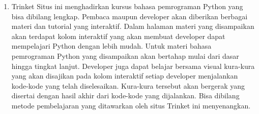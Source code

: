 \begin{enumerate}
\item Trinket 
Situs ini menghadirkan kursus bahasa pemrograman Python 
yang bisa dibilang lengkap. Pembaca maupun developer 
akan diberikan berbagai materi dan tutorial yang interaktif. 
Dalam halaman materi yang disampaikan akan terdapat 
kolom interaktif yang akan membuat developer dapat mempelajari 
Python dengan lebih mudah. 
Untuk materi bahasa pemrograman Python yang disampaikan 
akan bertahap mulai dari dasar hingga tingkat lanjut. 
Developer juga dapat belajar bersama visual kura-kura 
yang akan disajikan pada kolom interaktif setiap developer 
menjalankan kode-kode yang telah diselesaikan. 
Kura-kura tersebut akan bergerak yang disertai dengan 
hasil akhir dari kode-kode yang dijalankan. Bisa dibilang 
metode pembelajaran yang ditawarkan oleh situs Trinket ini 
menyenangkan.
\end{enumerate}



